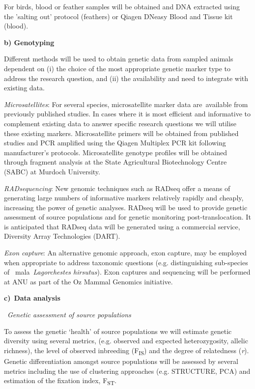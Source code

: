 \documentclass[version=last,
    paper=a4,                               %
    10pt,                                   %
    dvipsnames,
    oneside,                              %
    headings=openany,                       %
    open=any,
    BCOR=7mm,                               %
    DIV=15,     %
]{scrbook}
\begin{document}
For birds, blood or feather samples will be obtained and DNA extracted
using the 'salting out' protocol (feathers) or Qiagen DNeasy Blood and
Tissue kit (blood).

\textbf{b) Genotyping}

Different methods will be used to obtain genetic data from sampled
animals dependent on (i) the choice of the most appropriate genetic
marker type to address the research question, and (ii) the availability
and need to integrate with existing data.

\emph{Microsatellites}: For several species, microsatellite marker data
are~available from previously published studies. In cases where it is
most efficient and informative to complement existing data to answer
specific research questions we will utilise these existing markers.
Microsatellite primers will be obtained from published studies and PCR
amplified using the Qiagen Multiplex PCR kit following manufacturer's
protocols. Microsatellite genotype profiles will be obtained through
fragment analysis at the State Agricultural Biotechnology Centre (SABC)
at Murdoch University.

\emph{RADsequencing}: New genomic techniques such as RADseq offer a
means of generating large numbers of informative markers relatively
rapidly and cheaply, increasing the power of genetic analyses. RADseq
will be used to provide genetic assessment of source populations and for
genetic monitoring post-translocation. It is anticipated that RADseq
data will be generated using a commercial service, Diversity Array
Technologies (DART).

\emph{Exon capture}: An alternative genomic approach, exon capture, may
be employed when appropriate to address taxonomic questions (e.g.
distinguishing sub-species of ~mala~\emph{Lagorchestes hirsutus}). Exon
captures and sequencing will be performed at ANU as part of the Oz
Mammal Genomics initiative.

\textbf{c)}~\textbf{Data analysis}

~\emph{Genetic assessment of source populations}

To assess the genetic `health' of source populations we will estimate
genetic diversity using several metrics, (e.g. observed and expected
heterozygosity, allelic richness), the level of observed inbreeding
(F\textsubscript{IS}) and the degree of relatedness (\emph{r}). Genetic
differentiation amongst source populations will be assessed by several
metrics including the use of clustering approaches (e.g. STRUCTURE, PCA)
and estimation of the fixation index, F\textsubscript{ST}.
\end{document}
